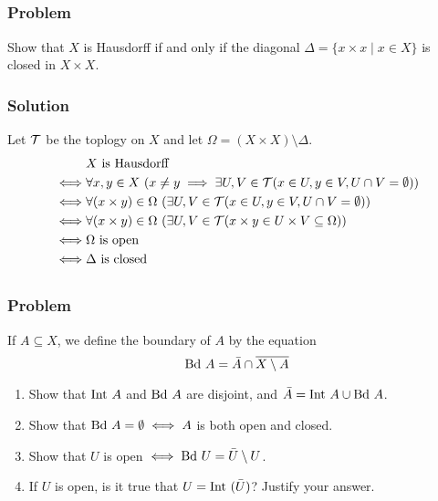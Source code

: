 
\setcounter{subsection}{12} %
\subsection{}
\subsubsection{Problem}
Show that $X$ is Hausdorff if and only if the diagonal $\Delta = \{x \times x \mid x \in X\}$ is closed in $X \times X$.
\subsubsection{Solution}
Let $\mathcal T$ be the toplogy on $X$ and let $\Omega = (X \times X) \setminus \Delta$.
\begin{align*}
& X \textrm{ is Hausdorff} \\
\iff& \forall x,y \in X \ (x \neq y \implies \exists U, V \in \mathcal T (x \in U, y \in V, U \cap V = \emptyset)) \\
\iff& \forall (x \times y) \in \Omega \ ( \exists U, V \in \mathcal T (x \in U, y \in V, U \cap V = \emptyset)) \\
\iff& \forall (x \times y) \in \Omega \ ( \exists U, V \in \mathcal T ( x \times y \in U \times V \subseteq \Omega)) \\
\iff& \Omega \textrm{ is open} \\
\iff& \Delta \textrm{ is closed}
\end{align*}


\setcounter{subsection}{18} %
\subsection{}
\subsubsection{Problem}
If $A \subseteq X$, we define the boundary of $A$ by the equation
\[\mathrm{Bd\ } A = \bar A \cap \overline{X \setminus A}\]
\begin{enumerate}
\item Show that $\mathrm{Int\ } A$ and $\mathrm{Bd\ } A$ are disjoint, and $\bar A = \mathrm{Int\ } A \cup \mathrm{Bd\ } A$.
\item Show that $\mathrm{Bd\ } A = \emptyset \iff A$ is both open and closed.
\item Show that $U$ is open $\iff \mathrm{Bd\ } U = \bar U \setminus U$.
\item If $U$ is open, is it true that $U = \mathrm{Int\ }(\bar U)$? Justify your answer.
\end{enumerate}

